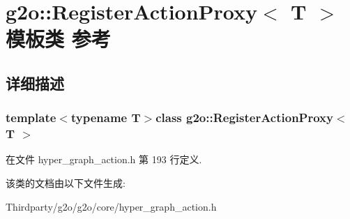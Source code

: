 \hypertarget{classg2o_1_1RegisterActionProxy}{\section{g2o\-:\-:Register\-Action\-Proxy$<$ T $>$ 模板类 参考}
\label{classg2o_1_1RegisterActionProxy}
}


\subsection{详细描述}
\subsubsection*{template$<$typename T$>$class g2o\-::\-Register\-Action\-Proxy$<$ T $>$}



在文件 hyper\-\_\-graph\-\_\-action.\-h 第 193 行定义.



该类的文档由以下文件生成\-:\begin{DoxyCompactItemize}
\item 
Thirdparty/g2o/g2o/core/hyper\-\_\-graph\-\_\-action.\-h\end{DoxyCompactItemize}
